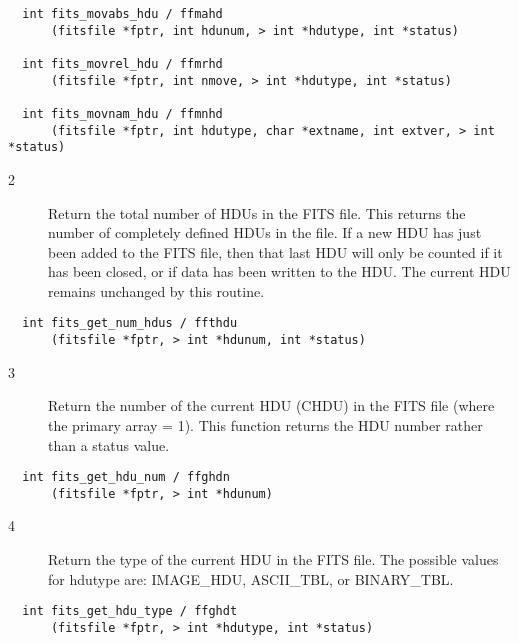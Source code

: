 \documentclass[11pt]{book}
\begin{document}
\begin{verbatim}
  int fits_movabs_hdu / ffmahd
      (fitsfile *fptr, int hdunum, > int *hdutype, int *status)

  int fits_movrel_hdu / ffmrhd
      (fitsfile *fptr, int nmove, > int *hdutype, int *status)

  int fits_movnam_hdu / ffmnhd
      (fitsfile *fptr, int hdutype, char *extname, int extver, > int *status)
\end{verbatim}

\begin{description}
\item[2 ] Return the total number of HDUs in the FITS file.  This returns the
number of completely defined HDUs in the file.  If a new HDU has just been added to
the FITS file, then that last HDU will only be counted if it has been closed,
or if data has been written to the HDU.
   The current HDU remains unchanged by this routine. \label{ffthdu}
\end{description}

\begin{verbatim}
  int fits_get_num_hdus / ffthdu
      (fitsfile *fptr, > int *hdunum, int *status)
\end{verbatim}

\begin{description}
\item[3 ] Return the number of the current HDU (CHDU) in the FITS file (where
    the primary array = 1).  This function returns the HDU number
   rather than a status value.  \label{ffghdn}
\end{description}

\begin{verbatim}
  int fits_get_hdu_num / ffghdn
      (fitsfile *fptr, > int *hdunum)
\end{verbatim}

\begin{description}
\item[4 ] Return the type of the current HDU in the FITS file.  The possible
   values for hdutype are: IMAGE\_HDU, ASCII\_TBL, or BINARY\_TBL.  \label{ffghdt}
\end{description}

\begin{verbatim}
  int fits_get_hdu_type / ffghdt
      (fitsfile *fptr, > int *hdutype, int *status)
\end{verbatim}
\end{document}

